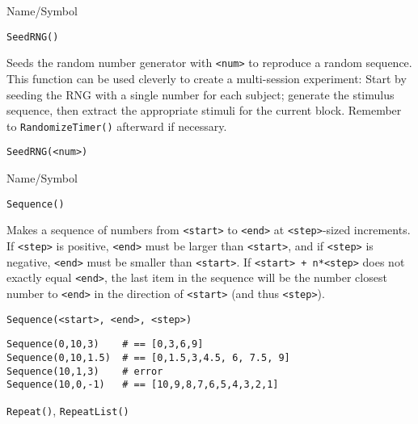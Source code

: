 \rl


\begin{desc}{Name/Symbol}
\item[Name/Symbol]   \verb+SeedRNG()+

\item[Description] Seeds the random number generator with \verb+<num>+
  to reproduce a random sequence.  This function can be used cleverly
  to create a multi-session experiment: Start by seeding the RNG with
  a single number for each subject; generate the stimulus sequence,
  then extract the appropriate stimuli for the current block. Remember
  to \verb+RandomizeTimer()+ afterward if necessary.

\item[Usage] 
\begin{verbatim}
SeedRNG(<num>) 
\end{verbatim}

\item[Example]	

\item[See Also]	
\end{desc}

\rl


\begin{desc}{Name/Symbol}
\item[Name/Symbol]   	\verb+Sequence()+

\item[Description] Makes a sequence of numbers from \verb+<start>+ to
  \verb+<end>+ at \verb+<step>+-sized increments. If \verb+<step>+ is
  positive, \verb+<end>+ must be larger than \verb+<start>+, and if
  \verb+<step>+ is negative, \verb+<end>+ must be smaller than
  \verb+<start>+. If \verb!<start> + n*<step>! does not exactly equal
  \verb+<end>+, the last item in the sequence will be the number
  closest number to \verb+<end>+ in the direction of \verb+<start>+
  (and thus \verb+<step>+).

\item[Usage] 
\begin{verbatim}
Sequence(<start>, <end>, <step>)
\end{verbatim}

\item[Example]
\begin{verbatim}
Sequence(0,10,3)    # == [0,3,6,9]
Sequence(0,10,1.5)  # == [0,1.5,3,4.5, 6, 7.5, 9]
Sequence(10,1,3)    # error
Sequence(10,0,-1)   # == [10,9,8,7,6,5,4,3,2,1]
\end{verbatim}

\item[See Also]    	\verb+Repeat()+, \verb+RepeatList()+
\end{desc}

